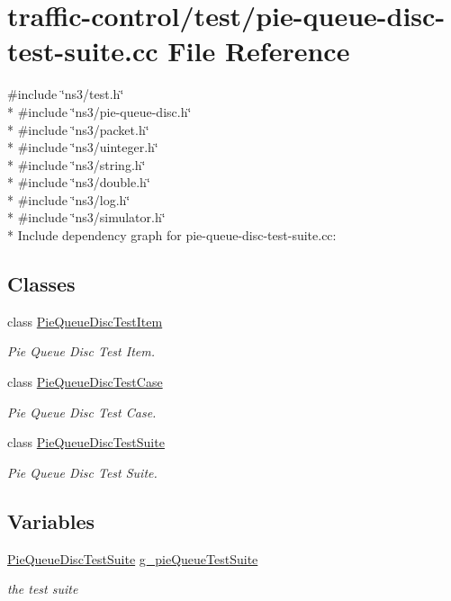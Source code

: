 \hypertarget{pie-queue-disc-test-suite_8cc}{}\section{traffic-\/control/test/pie-\/queue-\/disc-\/test-\/suite.cc File Reference}
\label{pie-queue-disc-test-suite_8cc}
{\ttfamily \#include \char`\"{}ns3/test.\+h\char`\"{}}\\*
{\ttfamily \#include \char`\"{}ns3/pie-\/queue-\/disc.\+h\char`\"{}}\\*
{\ttfamily \#include \char`\"{}ns3/packet.\+h\char`\"{}}\\*
{\ttfamily \#include \char`\"{}ns3/uinteger.\+h\char`\"{}}\\*
{\ttfamily \#include \char`\"{}ns3/string.\+h\char`\"{}}\\*
{\ttfamily \#include \char`\"{}ns3/double.\+h\char`\"{}}\\*
{\ttfamily \#include \char`\"{}ns3/log.\+h\char`\"{}}\\*
{\ttfamily \#include \char`\"{}ns3/simulator.\+h\char`\"{}}\\*
Include dependency graph for pie-\/queue-\/disc-\/test-\/suite.cc\+:
\subsection*{Classes}
\begin{DoxyCompactItemize}
\item 
class \hyperlink{classPieQueueDiscTestItem}{Pie\+Queue\+Disc\+Test\+Item}
\begin{DoxyCompactList}\small\item\em Pie Queue Disc Test Item. \end{DoxyCompactList}\item 
class \hyperlink{classPieQueueDiscTestCase}{Pie\+Queue\+Disc\+Test\+Case}
\begin{DoxyCompactList}\small\item\em Pie Queue Disc Test Case. \end{DoxyCompactList}\item 
class \hyperlink{classPieQueueDiscTestSuite}{Pie\+Queue\+Disc\+Test\+Suite}
\begin{DoxyCompactList}\small\item\em Pie Queue Disc Test Suite. \end{DoxyCompactList}\end{DoxyCompactItemize}
\subsection*{Variables}
\begin{DoxyCompactItemize}
\item 
\hyperlink{classPieQueueDiscTestSuite}{Pie\+Queue\+Disc\+Test\+Suite} \hyperlink{group__traffic-control-test_gaf853e0088fe05fab37addc1bd93bf24a}{g\+\_\+pie\+Queue\+Test\+Suite}
\begin{DoxyCompactList}\small\item\em the test suite \end{DoxyCompactList}\end{DoxyCompactItemize}
